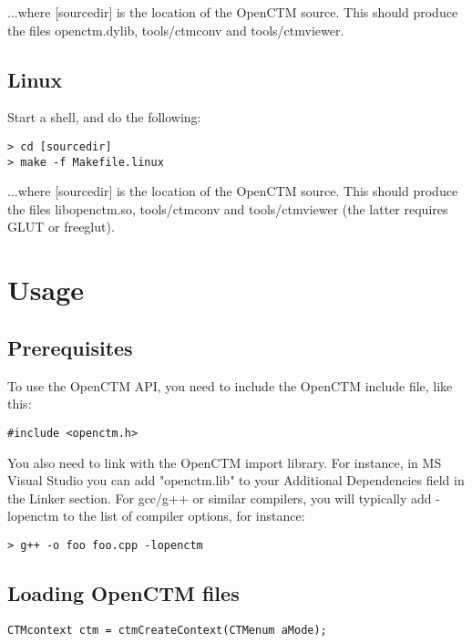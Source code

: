 ...where [sourcedir] is the location of the OpenCTM source. This should produce
the files openctm.dylib, tools/ctmconv and tools/ctmviewer.


\section{Linux}
Start a shell, and do the following:

\begin{lstlisting}
> cd [sourcedir]
> make -f Makefile.linux
\end{lstlisting}

...where [sourcedir] is the location of the OpenCTM source. This should produce
the files libopenctm.so, tools/ctmconv and tools/ctmviewer (the latter requires
GLUT or freeglut).




\chapter{Usage}

\section{Prerequisites}
To use the OpenCTM API, you need to include the OpenCTM include file, like this:

\begin{lstlisting}
#include <openctm.h>
\end{lstlisting}

You also need to link with the OpenCTM import library. For instance, in MS
Visual Studio you can add "openctm.lib" to your Additional Dependencies field
in the Linker section. For gcc/g++ or similar compilers, you will typically
add -lopenctm to the list of compiler options, for instance:

\begin{lstlisting}
> g++ -o foo foo.cpp -lopenctm
\end{lstlisting}



\section{Loading OpenCTM files}
\begin{lstlisting}
CTMcontext ctm = ctmCreateContext(CTMenum aMode);
\end{lstlisting}



